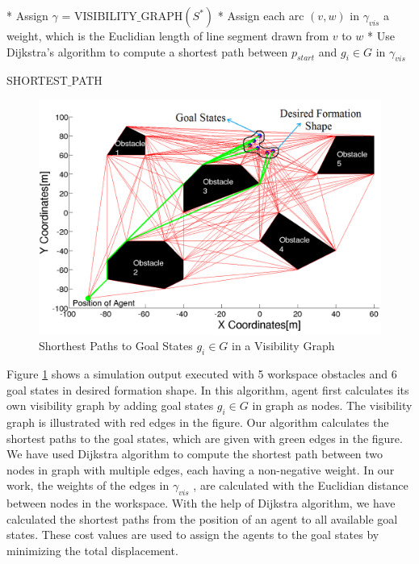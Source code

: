 \documentclass[letterpaper, 10 pt, conference]{ieeeconf}  %
\begin{document}
\begin{algorithm}
* Assign $\gamma$ = VISIBILITY$\_$GRAPH$(S^*)$ \newline
* Assign each arc $(v,w)$ in $\gamma_{vis}$ a weight, which is the Euclidian length of line segment drawn from $v$ to $w$ \newline
{}
{
* Use Dijkstra's algorithm to compute a shortest path between $p_{start}$ and $g_i \in G$ in $\gamma_{vis}$
}
\caption{SHORTEST$\_$PATH}
\end{algorithm}
  
\begin{figure}[thpb]
\centering
\includegraphics[scale = 0.22]{visgraph_yedek}
\caption{Shorthest Paths to Goal States $g_i \in G$ in a Visibility Graph} \label{dijksttae_visibility}
\end{figure}

Figure \ref{dijksttae_visibility} shows a simulation output executed with 5 workspace obstacles and 6 goal states in desired formation shape. In this algorithm, agent first calculates its own visibility graph by adding goal states $g_i \in G$ in graph as nodes. The visibility graph is illustrated with red edges in the figure. Our algorithm calculates the shortest paths to the goal states, which are given with green edges in the figure. We have used Dijkstra algorithm to compute the shortest path between two nodes in graph with multiple edges, each having a non-negative weight. In our work, the weights of the edges in $\gamma_{vis}$ , are calculated with the Euclidian distance between nodes in the workspace. With the help of Dijkstra algorithm, we have calculated the shortest paths from the position of an agent to all available goal states. These cost values are used to assign the agents to the goal states by minimizing the total displacement.  
\end{document}
